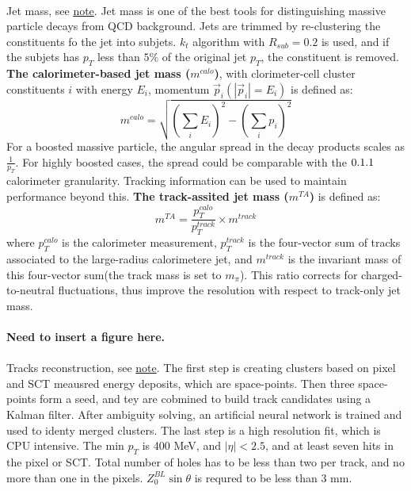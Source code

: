 \paragraph{}
Jet mass, see \href{https://cds.cern.ch/record/2200211/files/ATLAS-CONF-2016-035.pdf}{note}. Jet mass is one of the best tools for distinguishing massive particle decays from QCD background. Jets are trimmed by re-clustering the constituents fo the jet into subjets. $k_t$ algorithm with $R_{sub} = 0.2$ is used, and if the subjets has $p_T$ less than $5\%$ of the original jet $p_T$, the constituent is removed. \textbf{The calorimeter-based jet mass ($m^{calo}$)}, with clorimeter-cell cluster constituents $i$ with energy $E_i$, momentum $\vec{p}_i (|\vec{p}_i| = E_i)$ is defined as:
\begin{equation}
m^{calo} = \sqrt{(\sum_i E_i)^2 - (\sum_i p_i)^2}
\end{equation}
For a boosted massive particle, the angular spread in the decay products scales as $\frac{1}{p_T}$. For highly boosted cases, the spread could be comparable with the $0.1\time0.1$ calorimeter granularity. Tracking information can be used to maintain performance beyond this. \textbf{The track-assited jet mass ($m^{TA}$)} is defined as:
\begin{equation}
m^{TA} = \frac{p_{T}^{calo}}{p_{T}^{track}} \times m^{track}
\end{equation}
where $p_{T}^{calo}$ is the calorimeter measurement, $p_{T}^{track}$ is the four-vector sum of tracks associated to the large-radius calorimetere jet, and $m^{track}$ is the invariant mass of this four-vector sum(the track mass is set to $m_{\pi}$). This ratio corrects for charged-to-neutral fluctuations, thus improve the resolution with respect to track-only jet mass.

\paragraph{Need to insert a figure here.}


\paragraph{}
Tracks reconstruction, see \href{https://cds.cern.ch/record/2244610/files/PERF-2015-08-01.pdf}{note}. The first step is creating clusters based on pixel and SCT meausred energy deposits, which are space-points. Then three space-points form a seed, and tey are cobmined to build track candidates using a Kalman filter. After ambiguity solving, an artificial neural network is trained and used to identy merged clusters. The last step is a high resolution fit, which is CPU intensive. The min $p_T$ is 400 MeV, and $|\eta| < 2.5$, and at least seven hits in the pixel or SCT. Total number of holes has to be less than two per track, and no more than one in the pixels. $Z_{0}^{BL} \sin{\theta}$ is requred to be less than 3 mm.

